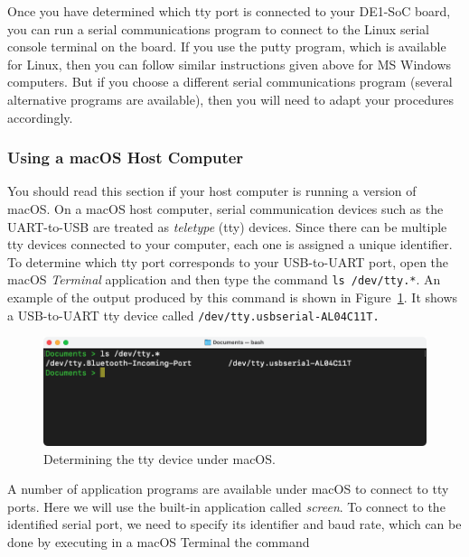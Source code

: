 \documentclass[11pt, twoside, pdftex]{article}
\begin{document}
Once you have determined which tty port is connected to your DE1-SoC board, you can run a
serial communications program to connect to the Linux serial console terminal on the
board. If you use the putty program, which is available for Linux, then you can follow
similar instructions given above for MS Windows computers. But if you choose a different
serial communications program (several alternative programs are available), then you will
need to adapt your procedures accordingly.

\subsubsection{Using a macOS Host Computer}

You should read this section if your host computer is running a version of macOS.
On a macOS host computer, serial communication devices such as the UART-to-USB are treated 
as \textit{teletype} (tty) devices. Since there can be multiple tty devices connected to
your computer,  each one is assigned a unique identifier.
To determine which tty port corresponds to your USB-to-UART port, open the macOS 
{\it Terminal} application and then type the command \texttt{ls /dev/tty.*}. An example of
the output produced by this command is shown in Figure~\ref{fig:macOSTerminal}. It shows
a USB-to-UART tty device called \texttt{/dev/tty.usbserial-AL04C11T.}

\begin{figure}[H]
   \begin{center}
       \includegraphics[scale=0.5]{figures/macOSTerminal.png}
   \end{center}
   \caption{Determining the tty device under macOS.}
	\label{fig:macOSTerminal}
\end{figure}

A number of application programs are available under macOS to connect to tty ports. Here
we will use the built-in application called {\it screen}. To connect to the identified
serial port, we need to specify its identifier and baud rate, which can be done by
executing in a macOS Terminal the command
\end{document}
